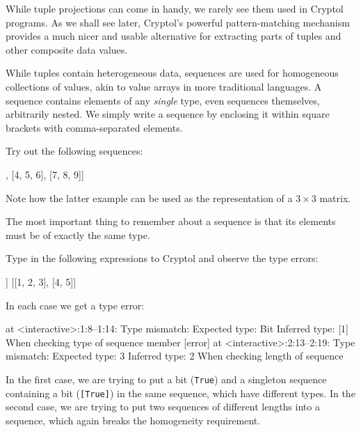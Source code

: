 \begin{tip}
  While tuple projections can come in handy, we rarely see them used
  in Cryptol programs. As we shall see later, Cryptol's powerful
  pattern-matching mechanism provides a much nicer and usable
  alternative for extracting parts of tuples and other composite data
  values.
\end{tip}


While tuples contain heterogeneous data, sequences are used for
homogeneous collections of values, akin to value arrays in more
traditional languages.  A sequence contains elements of any
\emph{single} type, even sequences themselves, arbitrarily nested.  We
simply write a sequence by enclosing it within square brackets with
comma-separated elements.\indTheSequenceType


\begin{Exercise}\label{ex:seq:1}
Try out the following sequences:
\restartrepl
\begin{replinVerb}
  [1, 2]
  [[1, 2, 3], [4, 5, 6], [7, 8, 9]]
\end{replinVerb}
\restartrepl
Note how the latter example can be used as the representation of a
$3\times3$ matrix.
\end{Exercise}

\begin{tip}
  The most important thing to remember about a sequence is that its
  elements must be of exactly the same type.
\end{tip}

\begin{Exercise}\label{ex:seq:2}
  Type in the following expressions to Cryptol and observe the
  type errors:
\restartrepl
\begin{replinVerb}
  [True, [True]]
  [[1, 2, 3], [4, 5]]
\end{replinVerb}
\end{Exercise}
\begin{Answer}
In each case we get a type error:
\begin{reploutVerb}
  [error] at <interactive>:1:8--1:14:
    Type mismatch:
      Expected type: Bit
      Inferred type: [1]
      When checking type of sequence member
  [error] at <interactive>:2:13--2:19:
    Type mismatch:
      Expected type: 3
      Inferred type: 2
      When checking length of sequence
\end{reploutVerb}
In the first case, we are trying to put a bit (\texttt{True}) and a
singleton sequence containing a bit (\texttt{[True]}) in the same
sequence, which have different types. In the second case, we are
trying to put two sequences of different lengths into a sequence,
which again breaks the homogeneity requirement.
\end{Answer}


